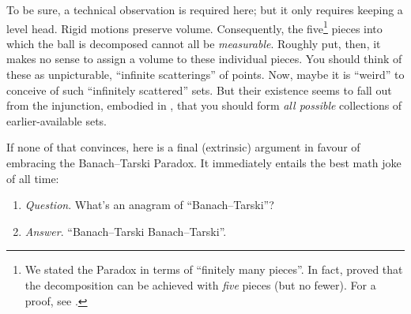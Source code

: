 \documentclass[../../../include/open-logic-section]{subfiles}
\begin{document}
To be sure, a technical observation is required here; but it only
requires keeping a level head. Rigid motions preserve volume.
Consequently, the five\footnote{We stated the Paradox in terms of
``finitely many pieces''. In fact, \citet{Robinson1947} proved that
the decomposition can be achieved with \emph{five} pieces
(but no fewer). For a proof, see \citet[pp.~66--7]{Wagon2016}.} pieces
into which the ball is decomposed cannot all be \emph{measurable}.
Roughly put, then, it makes no sense to assign a volume to these
individual pieces. You should think of these as unpicturable,
``infinite scatterings'' of points. Now, maybe it is ``weird'' to
conceive of such ``infinitely scattered'' sets. But their existence
seems to fall out from the injunction, embodied in \stagesacc{}, that
you should form \emph{all possible} collections of earlier-available
sets. 

If none of that convinces, here is a final (extrinsic) argument in
favour of embracing the Banach--Tarski Paradox. It immediately entails
the best math joke of all time:
\begin{enumerate}
	\item[] \emph{Question}. What's an anagram of ``Banach--Tarski''? 
	\item[] \emph{Answer}. ``Banach--Tarski Banach--Tarski''.
\end{enumerate}
\end{document}
